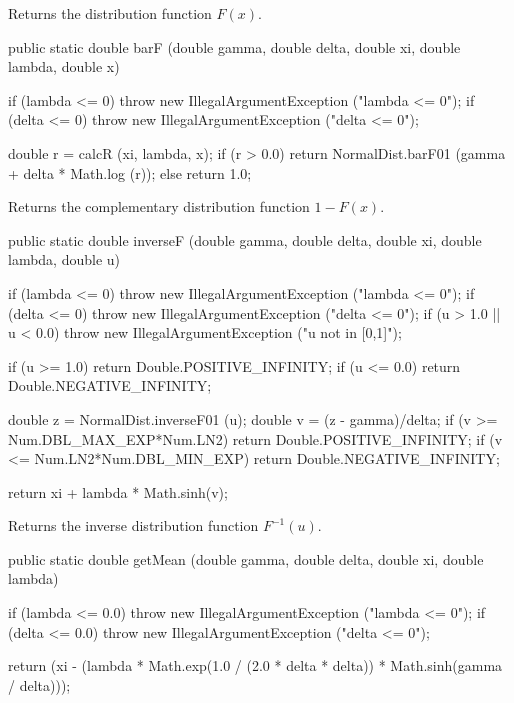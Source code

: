  \begin{tabb}
  Returns the  distribution function $F(x)$.
 \end{tabb}
\begin{code}

   public static double barF (double gamma, double delta,
                              double xi, double lambda, double x)\begin{hide} {
      if (lambda <= 0)
         throw new IllegalArgumentException ("lambda <= 0");
      if (delta <= 0)
         throw new IllegalArgumentException ("delta <= 0");

      double r = calcR (xi, lambda, x);
      if (r > 0.0)
         return NormalDist.barF01 (gamma + delta * Math.log (r));
      else
         return 1.0;
   }\end{hide}
\end{code}
  \begin{tabb}
  Returns the complementary distribution function $1-F(x)$.
 \end{tabb}
\begin{code}

   public static double inverseF (double gamma, double delta,
                                  double xi, double lambda, double u)\begin{hide} {
      if (lambda <= 0)
         throw new IllegalArgumentException ("lambda <= 0");
      if (delta <= 0)
         throw new IllegalArgumentException ("delta <= 0");
      if (u > 1.0 || u < 0.0)
          throw new IllegalArgumentException ("u not in [0,1]");

      if (u >= 1.0)
         return Double.POSITIVE_INFINITY;
      if (u <= 0.0)
         return Double.NEGATIVE_INFINITY;

      double z = NormalDist.inverseF01 (u);
      double v = (z - gamma)/delta;
      if (v >= Num.DBL_MAX_EXP*Num.LN2)
         return Double.POSITIVE_INFINITY;
      if (v <= Num.LN2*Num.DBL_MIN_EXP)
         return Double.NEGATIVE_INFINITY;

      return xi + lambda * Math.sinh(v);
   }\end{hide}
\end{code}
  \begin{tabb}
  Returns the inverse distribution function $F^{-1}(u)$.
 \end{tabb}
\begin{code}

   public static double getMean (double gamma, double delta,
                                 double xi, double lambda)\begin{hide} {
      if (lambda <= 0.0)
         throw new IllegalArgumentException ("lambda <= 0");
      if (delta <= 0.0)
         throw new IllegalArgumentException ("delta <= 0");

      return (xi - (lambda * Math.exp(1.0 / (2.0 * delta * delta)) *
                             Math.sinh(gamma / delta)));
   }\end{hide}
\end{code}
